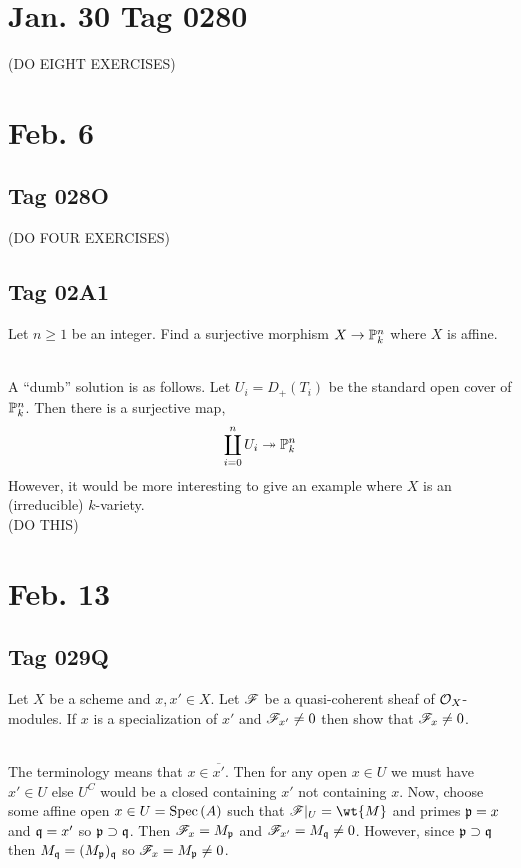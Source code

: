 \documentclass[12pt]{article}
\begin{document}
\section{Jan. 30 Tag 0280}

(DO EIGHT EXERCISES)

\section{Feb. 6}

\subsection{Tag 028O}

(DO FOUR EXERCISES)

\subsection{Tag 02A1}

\begin{exr}
Let $n \ge 1$ be an integer. Find a surjective morphism $X \to \P^n_{k}$ where $X$ is affine.
\end{exr}
\noindent\\
A ``dumb'' solution is as follows. Let $U_i = D_+(T_i)$ be the standard open cover of $\P^n_k$. Then there is a surjective map,
\[ \coprod_{i = 0}^n U_i \onto \P^n_k \]
However, it would be more interesting to give an example where $X$ is an (irreducible) $k$-variety. 
\bigskip\\
(DO THIS)

\section{Feb. 13}

\subsection{Tag 029Q}

\begin{exr}
Let $X$ be a scheme and $x, x' \in X$. Let $\F$ be a quasi-coherent sheaf of $\struct{X}$-modules. If $x$ is a specialization of $x'$ and $\F_{x'} \neq 0$ then show that $\F_x \neq 0$.
\end{exr}
\noindent\\
The terminology means that $x \in \overline{x'}$. Then for any open $x \in U$ we must have $x' \in U$ else $U^C$ would be a closed containing $x'$ not containing $x$. Now, choose some affine open $x \in U = \Spec{A}$ such that $\F |_U = \wt{M}$ and primes $\p = x$ and $\q = x'$ so $\p \supset \q$. Then $\F_{x} = M_{\p}$ and $\F_{x'} = M_{\q} \neq 0$. However, since $\p \supset \q$ then $M_{\q} = (M_\p)_\q$ so $\F_{x} = M_\p \neq 0$.
\end{document}
